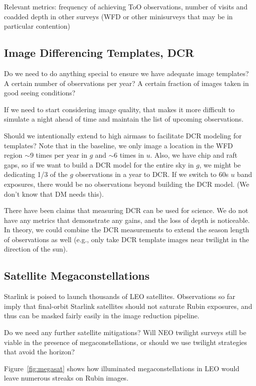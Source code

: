 Relevant metrics: frequency of achieving ToO observations, number of visits and coadded depth in other surveys (WFD or other minisurveys that may be in particular contention)


\subsection{Image Differencing Templates, DCR}

Do we need to do anything special to ensure we have adequate image templates? A certain number of observations per year? A certain fraction of images taken in good seeing conditions? 

If we need to start considering image quality, that makes it more difficult to simulate a night ahead of time and maintain the list of upcoming observations.

Should we intentionally extend to high airmass to facilitate DCR modeling for templates? Note that in the baseline, we only image a location in the WFD region $\sim$9 times per year in $g$ and $\sim$6 times in $u$. Also, we have chip and raft gaps, so if we want to build a DCR model for the entire sky in $g$, we might be dedicating 1/3 of the $g$ observations in a year to DCR. If we switch to 60s $u$ band exposures, there would be no observations beyond building the DCR model. (We don't know that DM needs this).

There have been claims that measuring DCR can be used for science.  We do not have any metrics that demonstrate any gains, and the loss of depth is noticeable. In theory, we could combine the DCR measurements to extend the season length of observations as well (e.g., only take DCR template images near twilight in the direction of the sun).


\subsection{Satellite Megaconstellations}

Starlink is poised to launch thousands of LEO satellites. Observations so far imply that final-orbit Starlink satellites should not saturate Rubin exposures, and thus can be masked fairly easily in the image reduction pipeline. 

Do we need any further satellite mitigations? Will NEO twilight surveys still be viable in the presence of megaconstellations, or should we use twilight strategies that avoid the horizon?

Figure~\ref{fig:megasat} shows how illuminated megaconstellations in LEO would leave numerous streaks on Rubin images.

